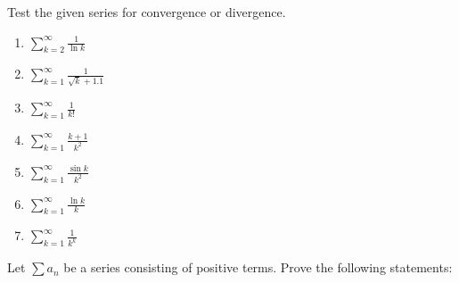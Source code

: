 \documentclass[week=6]{homework}
\date{\today}
\begin{document}
    \maketitle
    \thispagestyle{empty}
    \newpage
    \begin{questions}
		\let\firstquestion\question
		\renewcommand*{\question}{\vspace{7mm}\firstquestion}
        \firstquestion
        Test the given series for convergence or divergence.
        \begin{enumerate}[label=(\alph*)]
        	\item $\displaystyle \sum_{k=2}^{\infty} \frac{1}{\ln k}$
        	
        	
        	\item $\displaystyle \sum_{k=1}^{\infty} \frac{1}{\sqrt k + 1.1}$
        	
        	
        	\addtocounter{enumi}{2}
        	\item $\displaystyle \sum_{k=1}^{\infty} \frac{1}{k!}$
        	
        	
        	\item $\displaystyle \sum_{k=1}^{\infty} \frac{k+1}{k^2}$
        	
        	
        	\addtocounter{enumi}{3}
        	\item $\displaystyle \sum_{k=1}^{\infty} \frac{\sin k}{k^2}$
        	
        	
        	\item $\displaystyle \sum_{k=1}^{\infty} \frac{\ln k}{k}$
        	
        	
        	\addtocounter{enumi}{1}
        	\item $\displaystyle \sum_{k=1}^{\infty} \frac{1}{k^k}$
        	
        \end{enumerate}
	    
	    \question
	    Let $\sum a_n$ be a series consisting of positive terms. Prove the following statements:
	    \begin{parts}

\end{parts}
\end{questions}
\end{document}

